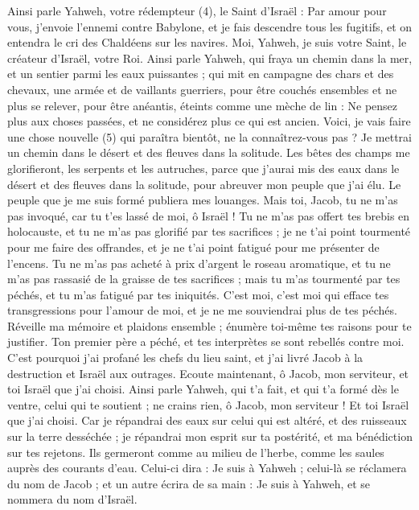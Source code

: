 \begin{multicols}{2}
Ainsi parle Yahweh, votre rédempteur (4), le Saint d'Israël : Par amour pour vous, j’envoie l’ennemi contre Babylone, et je fais descendre tous les fugitifs, et on entendra le cri des Chaldéens sur les navires.
Moi, Yahweh, je suis votre Saint, le créateur d'Israël, votre Roi.
Ainsi parle Yahweh, qui fraya un chemin dans la mer, et un sentier parmi les eaux puissantes ;
qui mit en campagne des chars et des chevaux, une armée et de vaillants guerriers, pour être couchés ensembles et ne plus se relever, pour être anéantis, éteints comme une mèche de lin :
Ne pensez plus aux choses passées, et ne considérez plus ce qui est ancien.
Voici, je vais faire une chose nouvelle (5) qui paraîtra bientôt, ne la connaîtrez-vous pas ? Je mettrai un chemin dans le désert et des fleuves dans la solitude.
Les bêtes des champs me glorifieront, les serpents et les autruches, parce que j'aurai mis des eaux dans le désert et des fleuves dans la solitude, pour abreuver mon peuple que j'ai élu.
Le peuple que je me suis formé publiera mes louanges.
Mais toi, Jacob, tu ne m'as pas invoqué, car tu t'es lassé de moi, ô Israël !
Tu ne m'as pas offert tes brebis en holocauste, et tu ne m'as pas glorifié par tes sacrifices ; je ne t'ai point tourmenté pour me faire des offrandes, et je ne t'ai point fatigué pour me présenter de l'encens.
Tu ne m'as pas acheté à prix d'argent le roseau aromatique, et tu ne m'as pas rassasié de la graisse de tes sacrifices ; mais tu m'as tourmenté par tes péchés, et tu m'as fatigué par tes iniquités.
C'est moi, c'est moi qui efface tes transgressions pour l'amour de moi, et je ne me souviendrai plus de tes péchés.
Réveille ma mémoire et plaidons ensemble ; énumère toi-même tes raisons pour te justifier.
Ton premier père a péché, et tes interprètes se sont rebellés contre moi.
C'est pourquoi j’ai profané les chefs du lieu saint, et j’ai livré Jacob à la destruction et Israël aux outrages.
\VerseOne{}Ecoute maintenant, ô Jacob, mon serviteur, et toi Israël que j'ai choisi.
Ainsi parle Yahweh, qui t'a fait, et qui t’a formé dès le ventre, celui qui te soutient ; ne crains rien, ô Jacob, mon serviteur ! Et toi Israël que j'ai choisi.
Car je répandrai des eaux sur celui qui est altéré, et des ruisseaux sur la terre desséchée ; je répandrai mon esprit sur ta postérité, et ma bénédiction sur tes rejetons.
Ils germeront comme au milieu de l’herbe, comme les saules auprès des courants d’eau.
Celui-ci dira : Je suis à Yahweh ; celui-là se réclamera du nom de Jacob ; et un autre écrira de sa main : Je suis à Yahweh, et se nommera du nom d'Israël.

\end{multicols}
